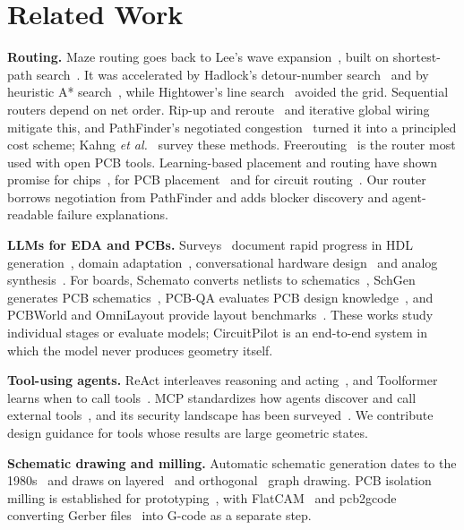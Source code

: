 \documentclass[journal]{IEEEtran}
\begin{document}
\section{Related Work}
\label{sec:related}

\textbf{Routing.} Maze routing goes back to Lee's wave expansion~\cite{lee1961}, built on shortest-path search~\cite{dijkstra1959}. It was accelerated by Hadlock's detour-number search~\cite{hadlock1977} and by heuristic A* search~\cite{hart1968}, while Hightower's line search~\cite{hightower1969} avoided the grid. Sequential routers depend on net order. Rip-up and reroute~\cite{dees1982} and iterative global wiring~\cite{nair1987} mitigate this, and PathFinder's negotiated congestion~\cite{mcmurchie1995} turned it into a principled cost scheme; Kahng \emph{et al.}~\cite{kahng2011} survey these methods. Freerouting~\cite{freerouting} is the router most used with open PCB tools. Learning-based placement and routing have shown promise for chips~\cite{mirhoseini2021}, for PCB placement~\cite{vassallo2024} and for circuit routing~\cite{he2022}. Our router borrows negotiation from PathFinder and adds blocker discovery and agent-readable failure explanations.

\textbf{LLMs for EDA and PCBs.} Surveys~\cite{zhong2023llm4eda,pan2025survey} document rapid progress in HDL generation~\cite{chang2023chipgpt,thakur2024verigen}, domain adaptation~\cite{liu2023chipnemo}, conversational hardware design~\cite{blocklove2023chipchat} and analog synthesis~\cite{lai2025analogcoder}. For boards, Schemato converts netlists to schematics~\cite{matsuo2025schemato}, SchGen generates PCB schematics~\cite{luo2026schgen}, PCB-QA evaluates PCB design knowledge~\cite{srinivasan2026pcbqa}, and PCBWorld and OmniLayout provide layout benchmarks~\cite{song2026pcbworld,lu2026omnilayout}. These works study individual stages or evaluate models; CircuitPilot is an end-to-end system in which the model never produces geometry itself.

\textbf{Tool-using agents.} ReAct interleaves reasoning and acting~\cite{yao2023react}, and Toolformer learns when to call tools~\cite{schick2023toolformer}. MCP standardizes how agents discover and call external tools~\cite{anthropic2024mcp,mcpspec}, and its security landscape has been surveyed~\cite{hou2026mcp}. We contribute design guidance for tools whose results are large geometric states.

\textbf{Schematic drawing and milling.} Automatic schematic generation dates to the 1980s~\cite{arya1985} and draws on layered~\cite{sugiyama1981} and orthogonal~\cite{tamassia1987} graph drawing. PCB isolation milling is established for prototyping~\cite{sterian2001}, with FlatCAM~\cite{flatcam} and pcb2gcode~\cite{pcb2gcode} converting Gerber files~\cite{gerber2026} into G-code as a separate step.
\end{document}
